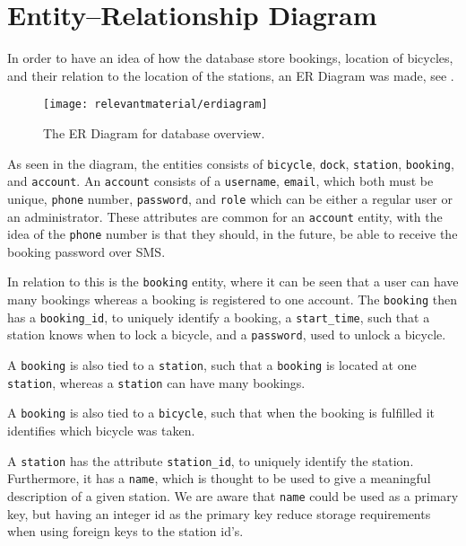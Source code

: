 \section{Entity--Relationship Diagram}\label{sec:ERdiagram}
In order to have an idea of how the database store bookings, location of bicycles, and their relation to the location of the stations, an ER Diagram was made, see .

\begin{figure}[h]
	\centering
	\texttt{[image: relevantmaterial/erdiagram]}
	\caption{The ER Diagram for database overview.}\label{fig:er-dia}
\end{figure}

As seen in the diagram, the entities consists of \texttt{bicycle}, \texttt{dock}, \texttt{station}, \texttt{booking}, and \texttt{account}.
An \texttt{account} consists of a \texttt{username}, \texttt{email}, which both must be unique, \texttt{phone} number, \texttt{password}, and \texttt{role} which can be either a regular user or an administrator.
These attributes are common for an \texttt{account} entity, with the idea of the \texttt{phone} number is that they should, in the future, be able to receive the booking password over SMS.

In relation to this is the \texttt{booking} entity, where it can be seen that a user can have many bookings whereas a booking is registered to one account.
The \texttt{booking} then has a \texttt{booking_id}, to uniquely identify a booking, a \texttt{start_time}, such that a station knows when to lock a bicycle, and a \texttt{password}, used to unlock a bicycle.

A \texttt{booking} is also tied to a \texttt{station}, such that a \texttt{booking} is located at one \texttt{station}, whereas a \texttt{station} can have many bookings.

A \texttt{booking} is also tied to a \texttt{bicycle}, such that when the booking is fulfilled it identifies which bicycle was taken.

A \texttt{station} has the attribute \texttt{station_id}, to uniquely identify the station.
Furthermore, it has a \texttt{name}, which is thought to be used to give a meaningful description of a given station.
We are aware that \texttt{name} could be used as a primary key, but having an integer id as the primary key reduce storage requirements when using foreign keys to the station id's.

